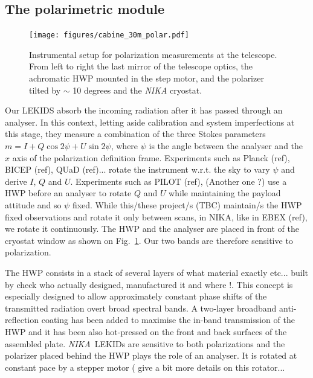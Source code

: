 \documentclass[twocolumn,traditabstract]{aa}
\newcommand{\nika}{{\it NIKA}}
\begin{document}
{\subsection{The polarimetric module}
\label{se:pol_module}

\begin{figure}
  \begin{center}
    \texttt{[image: figures/cabine\_30m\_polar.pdf]}
    \caption{ Instrumental setup for polarization measurements at
      the telescope. From left to right the last mirror of the telescope optics,
      the achromatic HWP mounted in the step motor, and the polarizer tilted by
      $\sim$ 10 degrees and the {\it NIKA} cryostat.}
    \label{cabin}
  \end{center}
\end{figure}


Our LEKIDS absorb the incoming radiation after it has passed through an
analyser. In this context, letting aside calibration and system imperfections at
this stage, they measure a combination of the three Stokes parameters $m = I +
Q\cos2\psi + U\sin2\psi$, where $\psi$ is the angle between the analyser and the
$x$ axis of the polarization definition frame. Experiments such as Planck
{\color{red}(ref)}, BICEP {\color{red}(ref)}, QUaD {\color{red}(ref)}... rotate
the instrument w.r.t. the sky to vary $\psi$ and derive $I$, $Q$ and
$U$. Experiments such as PILOT {\color{red}(ref)}, {\color{red}(Another one ?)}
use a HWP before an analyser to rotate $Q$ and $U$ while maintaining the payload
attitude and so $\psi$ fixed. While this/these project/s {\color{red}(TBC)}
maintain/s the HWP fixed observations and rotate it only between scans, in NIKA,
like in EBEX {\color{red}(ref)}, we rotate it continuously. The
HWP and the analyser are placed in front of the cryostat window as shown on
Fig.~\ref{cabin}. Our two bands are therefore sensitive to polarization.


The HWP consists in a stack of several layers of {\color{red} what material
  exactly etc...} built by \cite{savini2006} {\color{red} check who actually
  designed, manufactured it and where !}. This concept is especially designed to
allow approximately constant phase shifts of the transmitted radiation overt
broad spectral bands. A two-layer broadband anti-reflection coating has been
added to maximise the in-band transmission of the HWP and it has been also
hot-pressed on the front and back surfaces of the assembled plate. \nika~LEKIDs
are sensitive to both polarizations and the polarizer placed behind the HWP
plays the role of an analyser. It is rotated at constant pace by a stepper motor
({\color{red} give a bit more details on this rotator...}
  
}
\end{document}
